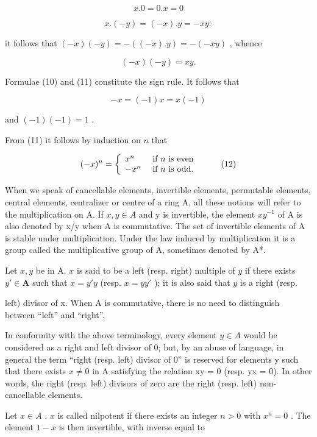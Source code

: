 \[
x. 0 = 0. x = 0\tag{9}
\]

\[
x. (- y) = (- x). y = - x y;\tag{10}
\]

it follows that \((-x)(-y) = -((-x).y) = -(-xy)\) , whence

\[
(- x) (- y) = x y.\tag{11}
\]

Formulae (10) and (11) constitute the sign rule. It follows that

\[
- x = (- 1) x = x (- 1)
\]

and \((-1)(-1) = 1\) .

From (11) it follows by induction on \(n\) that

\[
(- x) ^ {n} = \left\{ \begin{array}{l l} x ^ {n} & \text { if   } n \text {   is   even } \\ - x ^ {n} & \text { if   } n \text {   is   odd. } \end{array} \right.\tag{12}
\]

When we speak of cancellable elements, invertible elements, permutable elements, central elements, centralizer or centre of a ring A, all these notions will refer to the multiplication on A. If \(x, y \in A\) and y is invertible, the element \(xy^{-1}\) of A is also denoted by x/y when A is commutative. The set of invertible elements of A is stable under multiplication. Under the law induced by multiplication it is a group called the multiplicative group of A, sometimes denoted by A*.

Let \(x, y\) be in A. \(x\) is said to be a left (resp. right) multiple of \(y\) if there exists \(y' \in \mathbf{A}\) such that \(x = y'y\) (resp. \(x = yy'\) ); it is also said that \(y\) is a right (resp.

left) divisor of x. When A is commutative, there is no need to distinguish between ``left'' and ``right''.

In conformity with the above terminology, every element \(y \in A\) would be considered as a right and left divisor of 0; but, by an abuse of language, in general the term ``right (resp. left) divisor of 0'' is reserved for elements y such that there exists \(x \neq 0\) in A satisfying the relation xy = 0 (resp. yx = 0). In other words, the right (resp. left) divisors of zero are the right (resp. left) non-cancellable elements.

Let \(x \in A\) . \(x\) is called nilpotent if there exists an integer \(n > 0\) with \(x^n = 0\) . The element \(1 - x\) is then invertible, with inverse equal to


